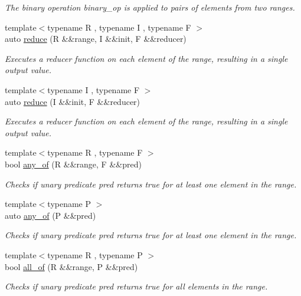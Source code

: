 \begin{DoxyCompactItemize}
\begin{DoxyCompactList}\small\item\em The binary operation binary\+\_\+op is applied to pairs of elements from two ranges. \end{DoxyCompactList}\item 
{\footnotesize template$<$typename R , typename I , typename F $>$ }\\auto \mbox{\hyperlink{namespacerah_a407b50a4f029e3f2a3cd0ba9142aea84}{reduce}} (R \&\&range, I \&\&init, F \&\&reducer)
\begin{DoxyCompactList}\small\item\em Executes a reducer function on each element of the range, resulting in a single output value. \end{DoxyCompactList}\item 
{\footnotesize template$<$typename I , typename F $>$ }\\auto \mbox{\hyperlink{namespacerah_a6a6b7b7e3b78bb4bd16372fbb688c152}{reduce}} (I \&\&init, F \&\&reducer)
\begin{DoxyCompactList}\small\item\em Executes a reducer function on each element of the range, resulting in a single output value. \end{DoxyCompactList}\item 
{\footnotesize template$<$typename R , typename F $>$ }\\bool \mbox{\hyperlink{namespacerah_a836c57da2bd108c491f3ba96786f6aa4}{any\+\_\+of}} (R \&\&range, F \&\&pred)
\begin{DoxyCompactList}\small\item\em Checks if unary predicate pred returns true for at least one element in the range. \end{DoxyCompactList}\item 
{\footnotesize template$<$typename P $>$ }\\auto \mbox{\hyperlink{namespacerah_aa3f330b2354859d8a9e6df794a1e7a1a}{any\+\_\+of}} (P \&\&pred)
\begin{DoxyCompactList}\small\item\em Checks if unary predicate pred returns true for at least one element in the range. \end{DoxyCompactList}\item 
{\footnotesize template$<$typename R , typename P $>$ }\\bool \mbox{\hyperlink{namespacerah_aaf7abb6066c8adfe6959691c3a3ea4e2}{all\+\_\+of}} (R \&\&range, P \&\&pred)
\begin{DoxyCompactList}\small\item\em Checks if unary predicate pred returns true for all elements in the range. \end{DoxyCompactList}\item 

\end{DoxyCompactItemize}
